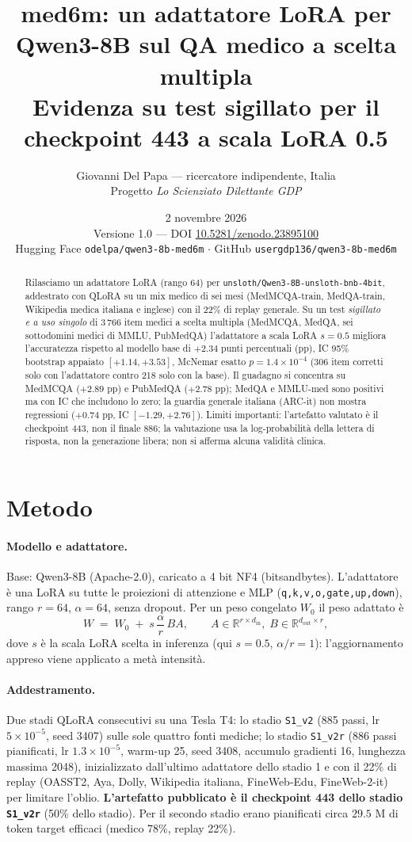 \documentclass[11pt,a4paper]{article}
\title{\textbf{med6m: un adattatore LoRA per Qwen3-8B sul QA medico a scelta multipla}\\[2pt]\large Evidenza su test sigillato per il checkpoint 443 a scala LoRA 0.5}
\author{Giovanni Del Papa --- ricercatore indipendente, Italia\\ \small Progetto \emph{Lo Scienziato Dilettante GDP}}
\date{2 novembre 2026\\ \small Versione 1.0 --- DOI \href{https://doi.org/10.5281/zenodo.23895100}{10.5281/zenodo.23895100}\\ \small Hugging Face \texttt{odelpa/qwen3-8b-med6m} $\cdot$ GitHub \texttt{usergdp136/qwen3-8b-med6m}}
\begin{document}
\maketitle
\begin{abstract}
Rilasciamo un adattatore LoRA (rango 64) per \texttt{unsloth/Qwen3-8B-unsloth-bnb-4bit}, addestrato con QLoRA su un mix medico di sei mesi (MedMCQA-train, MedQA-train, Wikipedia medica italiana e inglese) con il 22\% di replay generale. Su un test \emph{sigillato e a uso singolo} di 3\,766 item medici a scelta multipla (MedMCQA, MedQA, sei sottodomini medici di MMLU, PubMedQA) l'adattatore a scala LoRA $s=0.5$ migliora l'accuratezza rispetto al modello base di $+2.34$ punti percentuali (pp), IC 95\% bootstrap appaiato $[+1.14,+3.53]$, McNemar esatto $p=1.4\times10^{-4}$ (306 item corretti solo con l'adattatore contro 218 solo con la base). Il guadagno si concentra su MedMCQA ($+2.89$ pp) e PubMedQA ($+2.78$ pp); MedQA e MMLU-med sono positivi ma con IC che includono lo zero; la guardia generale italiana (ARC-it) non mostra regressioni ($+0.74$ pp, IC $[-1.29,+2.76]$). Limiti importanti: l'artefatto valutato è il checkpoint 443, non il finale 886; la valutazione usa la log-probabilità della lettera di risposta, non la generazione libera; non si afferma alcuna validità clinica.
\end{abstract}

\section{Metodo}
\paragraph{Modello e adattatore.} Base: Qwen3-8B (Apache-2.0), caricato a 4 bit NF4 (bitsandbytes). L'adattatore è una LoRA su tutte le proiezioni di attenzione e MLP (\texttt{q,k,v,o,gate,up,down}), rango $r=64$, $\alpha=64$, senza dropout. Per un peso congelato $W_0$ il peso adattato è
\begin{equation}\label{eq:lora}
W \;=\; W_0 \;+\; s\,\frac{\alpha}{r}\,B A,\qquad A\in\mathbb{R}^{r\times d_{\mathrm{in}}},\; B\in\mathbb{R}^{d_{\mathrm{out}}\times r},
\end{equation}
dove $s$ è la scala LoRA scelta in inferenza (qui $s=0.5$, $\alpha/r=1$): l'aggiornamento appreso viene applicato a metà intensità.

\paragraph{Addestramento.} Due stadi QLoRA consecutivi su una Tesla T4: lo stadio \texttt{S1\_v2} (885 passi, lr $5\times10^{-5}$, seed 3407) sulle sole quattro fonti mediche; lo stadio \texttt{S1\_v2r} (886 passi pianificati, lr $1.3\times10^{-5}$, warm-up 25, seed 3408, accumulo gradienti 16, lunghezza massima 2048), inizializzato dall'ultimo adattatore dello stadio 1 e con il 22\% di replay (OASST2, Aya, Dolly, Wikipedia italiana, FineWeb-Edu, FineWeb-2-it) per limitare l'oblio. \textbf{L'artefatto pubblicato è il checkpoint 443 dello stadio \texttt{S1\_v2r}} (50\% dello stadio). Per il secondo stadio erano pianificati circa $29.5$ M di token target efficaci (medico 78\%, replay 22\%).
\end{document}
